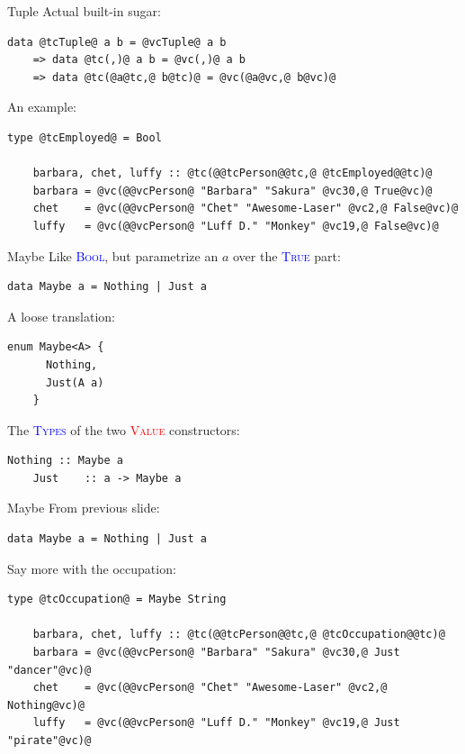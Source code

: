 \documentclass[xcolor={usenames,dvipsnames}]{beamer}
\newcommand{\htycon}[1]{\textcolor{Blue}{\textsc{#1}}}
\newcommand{\hvalcon}[1]{\textcolor{Red}{\textsc{#1}}}
\begin{document}
\begin{frame}[fragile]{Tuple}
  Actual built-in sugar:
  \begin{lstlisting}[style=hask]
       data @tcTuple@ a b = @vcTuple@ a b
    => data @tc(,)@ a b = @vc(,)@ a b
    => data @tc(@a@tc,@ b@tc)@ = @vc(@a@vc,@ b@vc)@
  \end{lstlisting}

  \pause
  An example:
  \begin{lstlisting}[style=hask]
    type @tcEmployed@ = Bool

    barbara, chet, luffy :: @tc(@@tcPerson@@tc,@ @tcEmployed@@tc)@
    barbara = @vc(@@vcPerson@ "Barbara" "Sakura" @vc30,@ True@vc)@
    chet    = @vc(@@vcPerson@ "Chet" "Awesome-Laser" @vc2,@ False@vc)@
    luffy   = @vc(@@vcPerson@ "Luff D." "Monkey" @vc19,@ False@vc)@
  \end{lstlisting}
\end{frame}

\begin{frame}[fragile]{Maybe}
  Like \htycon{Bool}, but parametrize an $a$ over the \htycon{True} part:
  \begin{lstlisting}[style=hask]
    data Maybe a = Nothing | Just a
  \end{lstlisting}

  \pause
  A loose translation:
  \begin{lstlisting}[style=hask]
    enum Maybe<A> {
      Nothing,
      Just(A a)
    }
  \end{lstlisting}

  \pause
  The \htycon{Types} of the two \hvalcon{Value} constructors:
  \begin{lstlisting}[style=hask]
    Nothing :: Maybe a
    Just    :: a -> Maybe a
  \end{lstlisting}
\end{frame}

\begin{frame}[fragile]{Maybe}
  From previous slide:
  \begin{lstlisting}[style=hask]
    data Maybe a = Nothing | Just a
  \end{lstlisting}

  \pause
  Say more with the occupation:
  \begin{lstlisting}[style=hask]
    type @tcOccupation@ = Maybe String

    barbara, chet, luffy :: @tc(@@tcPerson@@tc,@ @tcOccupation@@tc)@
    barbara = @vc(@@vcPerson@ "Barbara" "Sakura" @vc30,@ Just "dancer"@vc)@
    chet    = @vc(@@vcPerson@ "Chet" "Awesome-Laser" @vc2,@ Nothing@vc)@
    luffy   = @vc(@@vcPerson@ "Luff D." "Monkey" @vc19,@ Just "pirate"@vc)@
  \end{lstlisting}
\end{frame}
\end{document}
